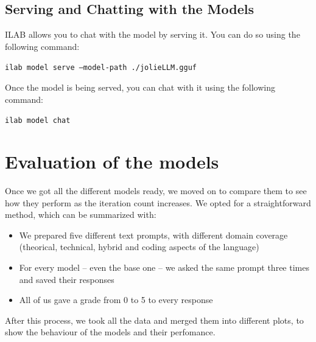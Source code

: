\documentclass[12pt]{article}
\begin{document}
\subsection{Serving and Chatting with the Models}
ILAB allows you to chat with the model by serving it. You can do so using the following command:
\begin{center}
    \texttt{ilab model serve --model-path ./jolieLLM.gguf}
\end{center}
Once the model is being served, you can chat with it using the following command:
\begin{center}
    \texttt{ilab model chat}
\end{center}

\section{Evaluation of the models}
Once we got all the different models ready, we moved on to compare them to see how they perform as the iteration count increases. We opted for a straightforward method, which can be summarized with:
\begin{itemize}
    \item We prepared five different text prompts, with different domain coverage (theorical, technical, hybrid and coding aspects of the language)
    \item For every model -- even the base one -- we asked the same prompt three times and saved their responses
    \item All of us gave a grade from 0 to 5 to every response
\end{itemize}
After this process, we took all the data and merged them into different plots, to show the behaviour of the models and their perfomance.
\end{document}

